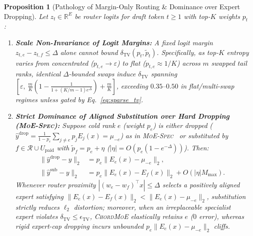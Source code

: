 \documentclass[10pt,twocolumn]{article}
\newtheorem{proposition}{Proposition}
\theoremstyle{definition}
\begin{document}
\begin{proposition}[Pathology of Margin-Only Routing \& Dominance over Expert Dropping]
\label{prop:margin_drop}
Let $z_t \in \mathbb{R}^E$ be router logits for draft token $t \ge 1$ with top-$K$ weights $p_t$:
\begin{enumerate}
  \item \textbf{Scale Non-Invariance of Logit Margins:} A fixed logit margin $z_{t,e} - z_{t,f} \le \Delta$ alone cannot bound $\delta_{\mathrm{TV}}(p_t, \tilde{p}_t)$. Specifically, as top-$K$ entropy varies from concentrated ($p_{t,e} \to \varepsilon$) to flat ($p_{t,e} \approx 1/K$) across $m$ swapped tail ranks, identical $\Delta$-bounded swaps induce $\delta_{\mathrm{TV}}$ spanning $[\varepsilon,\ \frac{m}{K}(1 - \frac{1}{1 + (K/m - 1)e^{\Delta}}) + \frac{m}{K}]$, exceeding $0.35\text{--}0.50$ in flat/multi-swap regimes unless gated by Eq.~\eqref{eq:sparse_tv}.
  \item \textbf{Strict Dominance of Aligned Substitution over Hard Dropping (\textsc{MoE-Spec}):} Suppose cold rank $e$ (weight $p_e$) is either \emph{dropped} ($\hat{y}^{\mathrm{drop}} = \frac{1}{1-p_e}\sum_{j \neq e} p_j E_j(x) = \mu_{-e}$) as in \textsc{MoE-Spec}~\cite{moespec2026} or \emph{substituted} by $f \in \mathcal{R} \cup U_{\mathrm{paid}}$ with $\tilde{p}_f = p_e + \eta$ ($|\eta| = O(p_e(1-e^{-\Delta}))$). Then:
  \[
    \begin{aligned}
      \|\hat{y}^{\mathrm{drop}} - y\|_2 &= p_e \|E_e(x) - \mu_{-e}\|_2, \\
      \|\hat{y}^{\mathrm{sub}} - y\|_2 &= p_e \|E_e(x) - E_f(x)\|_2 + O(|\eta| M_{\max}).
    \end{aligned}
  \]
  Whenever router proximity $|(w_e - w_f)^\top x| \le \Delta$ selects a positively aligned expert satisfying $\|E_e(x) - E_f(x)\|_2 < \|E_e(x) - \mu_{-e}\|_2$, substitution strictly reduces $\ell_2$ distortion; moreover, when an irreplaceable specialist expert violates $\delta_{\mathrm{TV}} \le \epsilon_{\mathrm{TV}}$, \textsc{ChordMoE} elastically retains $e$ ($0$ error), whereas rigid expert-cap dropping incurs unbounded $p_e \|E_e(x) - \mu_{-e}\|_2$ cliffs.
\end{enumerate}
\end{proposition}
\end{document}
